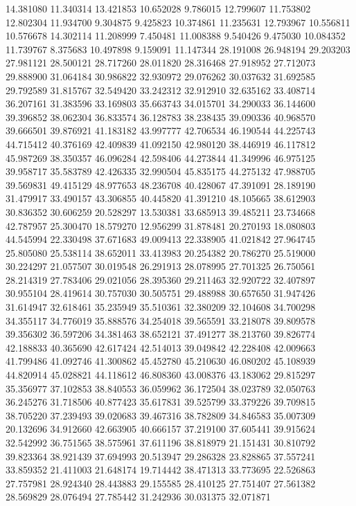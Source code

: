 14.381080
11.340314
13.421853
10.652028
9.786015
12.799607
11.753802
12.802304
11.934700
9.304875
9.425823
10.374861
11.235631
12.793967
10.556811
10.576678
14.302114
11.208999
7.450481
11.008388
9.540426
9.475030
10.084352
11.739767
8.375683
10.497898
9.159091
11.147344
28.191008
26.948194
29.203203
27.981121
28.500121
28.717260
28.011820
28.316468
27.918952
27.712073
29.888900
31.064184
30.986822
32.930972
29.076262
30.037632
31.692585
29.792589
31.815767
32.549420
33.242312
32.912910
32.635162
33.408714
36.207161
31.383596
33.169803
35.663743
34.015701
34.290033
36.144600
39.396852
38.062304
36.833574
36.128783
38.238435
39.090336
40.968570
39.666501
39.876921
41.183182
43.997777
42.706534
46.190544
44.225743
44.715412
40.376169
42.409839
41.092150
42.980120
38.446919
46.117812
45.987269
38.350357
46.096284
42.598406
44.273844
41.349996
46.975125
39.958717
35.583789
42.426335
32.990504
45.835175
44.275132
47.988705
39.569831
49.415129
48.977653
48.236708
40.428067
47.391091
28.189190
31.479917
33.490157
43.306855
40.445820
41.391210
48.105665
38.612903
30.836352
30.606259
20.528297
13.530381
33.685913
39.485211
23.734668
42.787957
25.300470
18.579270
12.956299
31.878481
20.270193
18.080803
44.545994
22.330498
37.671683
49.009413
22.338905
41.021842
27.964745
25.805080
25.538114
38.652011
33.413983
20.254382
20.786270
25.519000
30.224297
21.057507
30.019548
26.291913
28.078995
27.701325
26.750561
28.214319
27.783406
29.021056
28.395360
29.211463
32.920722
32.407897
30.955104
28.419614
30.757030
30.505751
29.488988
30.657650
31.947426
31.614947
32.618461
35.235949
35.510361
32.380209
32.104608
34.700298
34.355117
34.776019
35.888576
34.254018
39.565591
33.218078
39.809578
39.356302
36.597206
34.381463
38.652121
37.491277
38.213760
39.826774
42.188833
40.365690
42.617424
42.514013
39.049842
42.228408
42.009663
41.799486
41.092746
41.300862
45.452780
45.210630
46.080202
45.108939
44.820914
45.028821
44.118612
46.808360
43.008376
43.183062
29.815297
35.356977
37.102853
38.840553
36.059962
36.172504
38.023789
32.050763
36.245276
31.718506
40.877423
35.617831
39.525799
33.379226
39.709815
38.705220
37.239493
39.020683
39.467316
38.782809
34.846583
35.007309
20.132696
34.912660
42.663905
40.666157
37.219100
37.605441
39.915624
32.542992
36.751565
38.575961
37.611196
38.818979
21.151431
30.810792
39.823364
38.921439
37.694993
20.513947
29.286328
23.828865
37.557241
33.859352
21.411003
21.648174
19.714442
38.471313
33.773695
22.526863
27.757981
28.924340
28.443883
29.155585
28.410125
27.751407
27.561382
28.569829
28.076494
27.785442
31.242936
30.031375
32.071871
